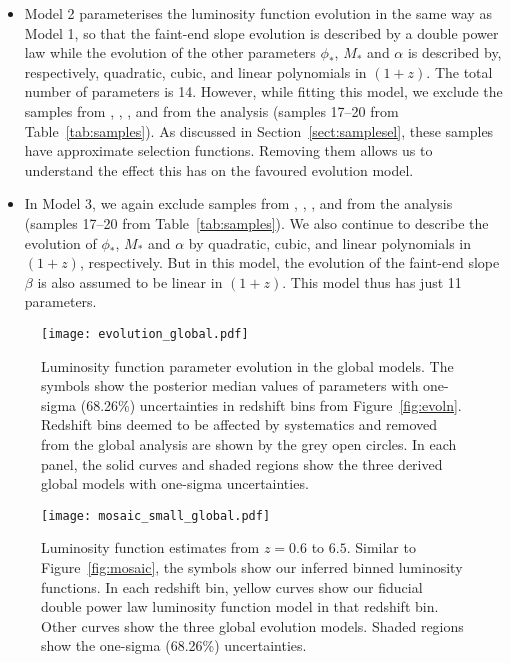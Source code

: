 \documentclass[fleqn,usenatbib]{mnras}
\begin{document}
\begin{itemize}
\item Model 2 parameterises the luminosity function evolution in the
  same way as Model 1, so that the faint-end slope evolution is
  described by a double power law while the evolution of the other
  parameters $\phi_*$, $M_*$ and $\alpha$ is described by,
  respectively, quadratic, cubic, and linear polynomials in $(1+z)$.
  The total number of parameters is 14.  However, while fitting this
  model, we exclude the samples from \citet{2015AA...578A..83G},
  \citet{2011Natur.474..616M}, \citet{2015ApJ...801L..11V}, and
  \citet{2018Natur.553..473B} from the analysis (samples 17--20 from
  Table~\ref{tab:samples}).  As discussed in
  Section~\ref{sect:samplesel}, these samples have approximate
  selection functions.  Removing them allows us to understand the
  effect this has on the favoured evolution model.

\item In Model 3, we again exclude samples from
  \citet{2015AA...578A..83G}, \citet{2011Natur.474..616M},
  \citet{2015ApJ...801L..11V}, and \citet{2018Natur.553..473B} from
  the analysis (samples 17--20 from Table~\ref{tab:samples}).  We also
  continue to describe the evolution of $\phi_*$, $M_*$ and $\alpha$
  by quadratic, cubic, and linear polynomials in $(1+z)$,
  respectively.  But in this model, the evolution of the faint-end
  slope $\beta$ is also assumed to be linear in $(1+z)$.  This model
  thus has just 11 parameters.
\end{itemize}

\begin{figure*}
  \begin{center}
    \texttt{[image: evolution\_global.pdf]}
  \end{center}
  \caption{Luminosity function parameter evolution in the global
    models.  The symbols show the posterior median values of
    parameters with one-sigma (68.26\%) uncertainties in redshift bins
    from Figure~\ref{fig:evoln}.  Redshift bins deemed to be affected
    by systematics and removed from the global analysis are shown by
    the grey open circles.  In each panel, the solid curves and shaded
    regions show the three derived global models with one-sigma
    uncertainties.}
  \label{fig:evoln_global}
\end{figure*}

\begin{figure*}
  \begin{center}
    \texttt{[image: mosaic\_small\_global.pdf]}
  \end{center}
  \caption{Luminosity function estimates from $z=0.6$ to $6.5$.
    Similar to Figure~\ref{fig:mosaic}, the symbols show our inferred
    binned luminosity functions.  In each redshift bin, yellow curves
    show our fiducial double power law luminosity function model in
    that redshift bin.  Other curves show the three global evolution
    models.  Shaded regions show the one-sigma (68.26\%)
    uncertainties.}
  \label{fig:mosaic_global}
\end{figure*}
\end{document}
